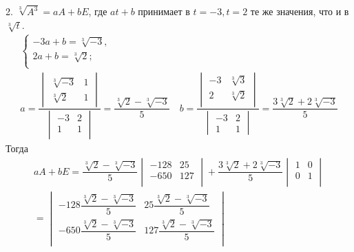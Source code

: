 \begin{enumerate}
				2. $\sqrt[3]{A^{3}} = aA + bE$, где $at + b$ принимает в $t = -3, t = 2$ те же значения, что и в $\sqrt[3]{t}$. 
				\begin{gather*}
					\begin{cases}
						-3a + b = \sqrt[3]{-3},\\
						2a + b = \sqrt[3]{2};\\
					\end{cases}
				\\
					a = 
					\dfrac{
					\begin{vmatrix} 
						\sqrt[3]{-3} & 1\\
						\sqrt[3]{2} & 1 
					\end{vmatrix}
					}{
					\begin{vmatrix}
						-3 & 2\\ 
						1 & 1\\ 
					\end{vmatrix}}
					= \dfrac{\sqrt[3]{2} - \sqrt[3]{-3}}{5}
					\quad
					b = 
					\dfrac{
					\begin{vmatrix}
						-3 & \sqrt[3]{3}\\
						2 & \sqrt[3]{2}\\
					\end{vmatrix}
					}{
					\begin{vmatrix}
						-3 & 2\\
						1 & 1
					\end{vmatrix}} 
					= \dfrac{3\sqrt[3]{2} + 2\sqrt[3]{-3}}{5}
				\end{gather*}
				Тогда 
				\begin{gather*}
					aA + bE = \dfrac{\sqrt[3]{2} - \sqrt[3]{-3}}{5}
					\begin{vmatrix}
						-128 & 25\\
						-650 & 127\\
					\end{vmatrix}
					+ \dfrac{3\sqrt[3]{2} + 2\sqrt[3]{-3}}{5}
					\begin{vmatrix}
						1 & 0\\
						0 & 1\\
					\end{vmatrix}
					\\
					=
					\begin{vmatrix}
						-128\dfrac{\sqrt[3]{2} - \sqrt[3]{-3}}{5} & 25\dfrac{\sqrt[3]{2} - \sqrt[3]{-3}}{5}\\
						-650\dfrac{\sqrt[3]{2} - \sqrt[3]{-3}}{5} & 127\dfrac{\sqrt[3]{2} - \sqrt[3]{-3}}{5}\\

\end{vmatrix}
\end{gather*}
\end{enumerate}
